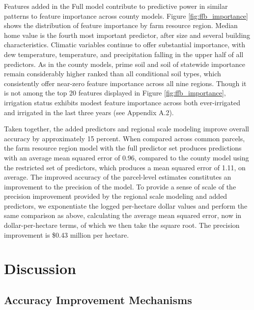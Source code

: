 \documentclass[12pt]{article}
\begin{document}
Features added in the Full model contribute to predictive power in similar patterns to feature importance across county models. Figure \ref{fig:ffb_importance} shows the distribution of feature importance by farm resource region. Median home value is the fourth most important predictor, after size and several building characteristics. Climatic variables continue to offer substantial importance, with dew temperature, temperature, and precipitation falling in the upper half of all predictors. As in the county models, prime soil and soil of statewide importance remain considerably higher ranked than all conditional soil types, which consistently offer near-zero feature importance across all nine regions. Though it is not among the top 20 features displayed in Figure \ref{fig:ffb_importance}, irrigation status exhibits modest feature importance across both ever-irrigated and irrigated in the last three years (see Appendix A.2).

Taken together, the added predictors and regional scale modeling improve overall accuracy by approximately 15 percent. When compared across common parcels, the farm resource region model with the full predictor set produces predictions with an average mean squared error of 0.96, compared to the county model using the restricted set of predictors, which produces a mean squared error of 1.11, on average. The improved accuracy of the parcel-level estimates constitutes an improvement to the precision of the model. To provide a sense of scale of the precision improvement provided by the regional scale modeling and added predictors, we exponentiate the logged per-hectare dollar values and perform the same comparison as above, calculating the average mean squared error, now in dollar-per-hectare terms, of which we then take the square root. The precision improvement is \$0.43 million per hectare. 

\section{Discussion}

\subsection{Accuracy Improvement Mechanisms}
\end{document}

